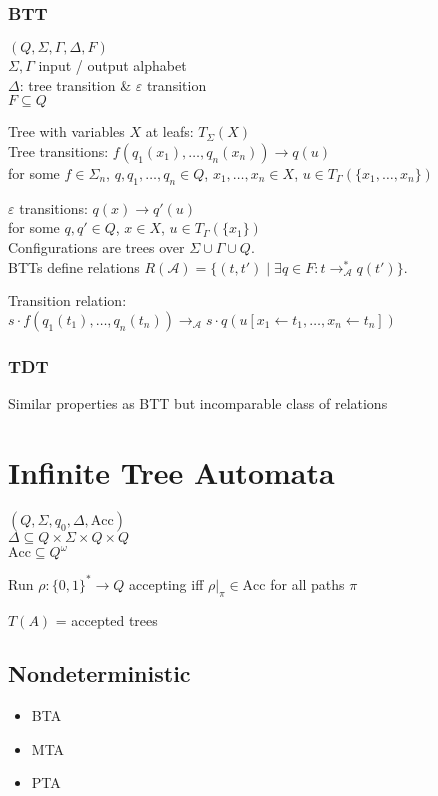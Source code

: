 \documentclass{article}
\begin{document}
\subsubsection*{BTT}
$(Q, \Sigma, \Gamma, \Delta, F)$ \\
$\Sigma, \Gamma$ input / output alphabet \\
$\Delta$: tree transition \& $\varepsilon$ transition \\
$F \subseteq Q$ 

Tree with variables $X$ at leafs: $T_\Sigma(X)$ \\

Tree transitions: $f(q_1(x_1), \dots, q_n(x_n)) \rightarrow q(u)$ \\
for some $f \in \Sigma_n$, $q, q_1, \dots, q_n \in Q$, $x_1, \dots, x_n \in X$, $u \in T_\Gamma(\{x_1, \dots, x_n\})$

$\varepsilon$ transitions: $q(x) \rightarrow q'(u)$ \\
for some $q, q' \in Q$, $x \in X$, $u \in T_\Gamma(\{x_1\})$ \\

Configurations are trees over $\Sigma \cup \Gamma \cup Q$. \\
BTTs define relations $R(\mathcal{A}) = \{ (t, t') \mid \exists q \in F: t \rightarrow_\mathcal{A}^* q(t')\}$.

Transition relation: $s \cdot f(q_1(t_1), \dots, q_n(t_n)) \rightarrow_\mathcal{A} s \cdot q(u[x_1 \leftarrow t_1, \dots, x_n \leftarrow t_n])$

\subsubsection*{TDT}
Similar properties as BTT but incomparable class of relations




\newpage
\section{Infinite Tree Automata}
$(Q, \Sigma, q_0, \Delta, \text{Acc})$ \\
$\Delta \subseteq Q \times \Sigma \times Q \times Q$ \\
$\text{Acc} \subseteq Q^\omega$

Run $\rho : \{0,1\}^* \rightarrow Q$ accepting iff $\rho \vert_\pi \in \text{Acc}$ for all paths $\pi$

$T(A)$ = accepted trees

\subsection{Nondeterministic}
\begin{itemize}
	\item BTA
	\item MTA
	\item PTA
\end{itemize}
\end{document}
